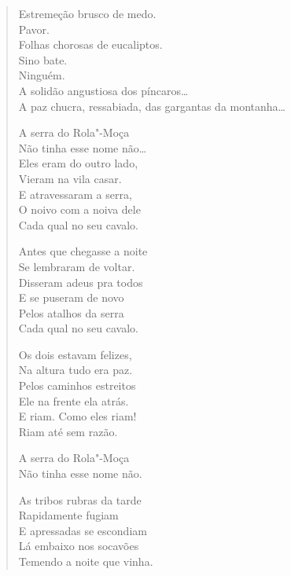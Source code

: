 \begin{verse}
Estremeção brusco de medo.\\
Pavor.\\
Folhas chorosas de eucaliptos.\\
Sino bate.\\
Ninguém.\\
A solidão angustiosa dos píncaros\ldots{}\\
A paz chucra, ressabiada, das gargantas da montanha\ldots{}


\quad\quad\quad{}A serra do Rola"-Moça\\
\quad\quad\quad{}Não tinha esse nome não\ldots{}\\
\quad\quad\quad{}Eles eram do outro lado,\\
\quad\quad\quad{}Vieram na vila casar.\\
\quad\quad\quad{}E atravessaram a serra,\\
\quad\quad\quad{}O noivo com a noiva dele\\
\quad\quad\quad{}Cada qual no seu cavalo.

\quad\quad\quad{}Antes que chegasse a noite\\
\quad\quad\quad{}Se lembraram de voltar.\\
\quad\quad\quad{}Disseram adeus pra todos\\
\quad\quad\quad{}E se puseram de novo\\
\quad\quad\quad{}Pelos atalhos da serra\\
\quad\quad\quad{}Cada qual no seu cavalo.

\quad\quad\quad{}Os dois estavam felizes,\\
\quad\quad\quad{}Na altura tudo era paz.\\
\quad\quad\quad{}Pelos caminhos estreitos\\
\quad\quad\quad{}Ele na frente ela atrás.\\
\quad\quad\quad{}E riam. Como eles riam!\\
\quad\quad\quad{}Riam até sem razão.

\quad\quad\quad{}A serra do Rola"-Moça\\
\quad\quad\quad{}Não tinha esse nome não.

\quad\quad\quad{}As tribos rubras da tarde\\
\quad\quad\quad{}Rapidamente fugiam\\
\quad\quad\quad{}E apressadas se escondiam\\
\quad\quad\quad{}Lá embaixo nos socavões\\
\quad\quad\quad{}Temendo a noite que vinha.


\end{verse}
